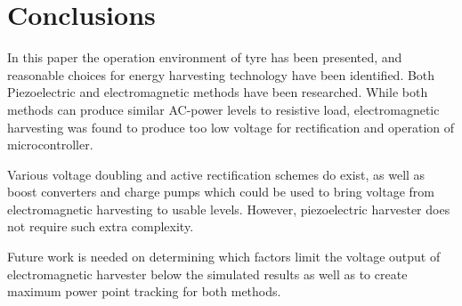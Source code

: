 \section{Conclusions}
In this paper the operation environment of tyre has been presented, and reasonable choices for energy harvesting technology have been identified. Both Piezoelectric and electromagnetic methods have been researched. While both methods can produce similar AC-power levels to resistive load, electromagnetic harvesting was found to produce too low voltage for rectification and operation of microcontroller. 

Various voltage doubling and active rectification schemes do exist, as well as boost converters and charge pumps which could be used to bring voltage from electromagnetic harvesting to usable levels. However, piezoelectric harvester does not require such extra complexity. 

Future work is needed on determining which factors limit the voltage output of electromagnetic harvester below the simulated results as well as to create maximum power point tracking for both methods. 